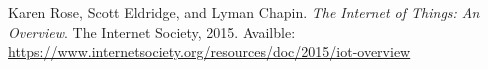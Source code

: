 \begin{thebibliography}{9}

    Karen Rose, Scott Eldridge, and Lyman Chapin.
    \textit{The Internet of Things: An Overview}.
    The Internet Society,
    2015.
    Availble: \url{https://www.internetsociety.org/resources/doc/2015/iot-overview}

\end{thebibliography}